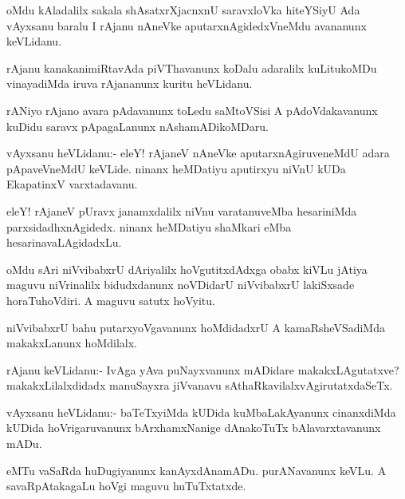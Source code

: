 \begin{mng}
oMdu kAladalilx sakala shAsatxrXjacnxnU saravxloVka hiteYSiyU Ada vAyxsanu baralu I rAjanu nAneVke aputarxnAgidedxVneMdu avananunx keVLidanu.
\end{mng}

\begin{mng}
rAjanu kanakanimiRtavAda piVThavanunx koDalu adaralilx kuLitukoMDu vinayadiMda iruva rAjananunx kuritu heVLidanu.
\end{mng}

\begin{mng}
rANiyo rAjano avara pAdavanunx toLedu saMtoVSisi A pAdoVdakavanunx kuDidu saravx pApagaLanunx nAshamADikoMDaru.
\end{mng}

\begin{mng}
vAyxsanu heVLidanu:- eleY! rAjaneV nAneVke aputarxnAgiruveneMdU adara pApaveVneMdU keVLide. ninanx heMDatiyu aputirxyu niVnU kUDa EkapatinxV varxtadavanu.
\end{mng}

\begin{mng}
eleY! rAjaneV pUravx janamxdalilx niVnu varatanuveMba hesariniMda parxsidadhxnAgidedx. ninanx heMDatiyu shaMkari eMba hesarinavaLAgidadxLu.
\end{mng}

\begin{mng}
oMdu sAri niVvibabxrU dAriyalilx hoVgutitxdAdxga obabx kiVLu jAtiya maguvu niVrinalilx bidudxdanunx noVDidarU niVvibabxrU lakiSxsade horaTuhoVdiri. A maguvu satutx hoVyitu.
\end{mng}

\begin{mng}
niVvibabxrU bahu putarxyoVgavanunx hoMdidadxrU A kamaRsheVSadiMda makakxLanunx hoMdilalx.
\end{mng}

\begin{mng}
rAjanu keVLidanu:- IvAga yAva puNayxvanunx mADidare makakxLAgutatxve? makakxLilalxdidadx manuSayxra jiVvanavu sAthaRkavilalxvAgirutatxdaSeTx.
\end{mng}

\begin{mng}
vAyxsanu heVLidanu:- baTeTxyiMda kUDida kuMbaLakAyanunx cinanxdiMda kUDida hoVrigaruvanunx bArxhamxNanige dAnakoTuTx bAlavarxtavanunx mADu.
\end{mng}

\begin{mng}
eMTu vaSaRda huDugiyanunx kanAyxdAnamADu. purANavanunx keVLu. A savaRpAtakagaLu hoVgi maguvu huTuTxtatxde.
\end{mng}


